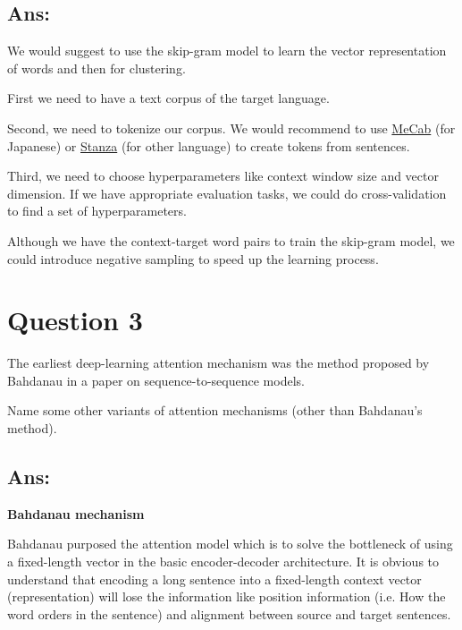 \documentclass{kthreport}
\begin{document}
\subsection{Ans:}


We would suggest to use the skip-gram model \cite{mikolov2013distributed}
to learn the vector representation of words and then for clustering.

First we need to have a text corpus of the target language.

Second, we need to tokenize our corpus. We would recommend to use
\href{https://taku910.github.io/mecab/}{MeCab} (for Japanese)
or \href{https://stanfordnlp.github.io/stanza/}{Stanza} (for other language)
to create tokens from sentences.

Third, we need to choose hyperparameters like context window size and vector dimension.
If we have appropriate evaluation tasks, we could do cross-validation to find
a set of hyperparameters.

Although we have the context-target word pairs to train the skip-gram model, we
could introduce negative sampling to speed up the learning process. \cite{mikolov2013distributed}

\section{Question 3}
The earliest deep-learning attention mechanism was the method proposed by Bahdanau
in a paper on sequence-to-sequence models.

Name some other variants of attention mechanisms (other than Bahdanau's method).

\subsection*{Ans:}

\textbf{Bahdanau mechanism}


Bahdanau purposed the attention model which is to solve the bottleneck of using
a fixed-length vector in the basic encoder-decoder architecture. It is obvious to understand
that encoding a long sentence into a fixed-length context vector (representation)
will lose the information like position information (i.e. How the word orders in the sentence)
and alignment between source and target sentences.
\end{document}
